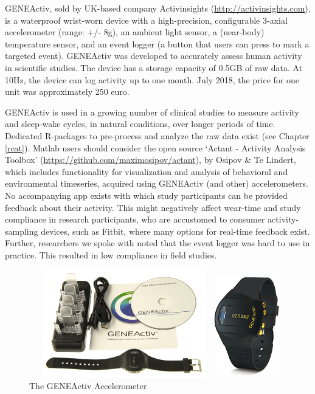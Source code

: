 \documentclass[]{book}
\begin{document}
 

GENEActiv, sold by UK-based company Activinsights
(\url{http://activinsights.com}), is a waterproof wrist-worn device with
a high-precision, configurable 3-axial accelerometer (range: +/- 8g), an
ambient light sensor, a (near-body) temperature sensor, and an event
logger (a button that users can press to mark a targeted event).
GENEActiv was developed to accurately assess human activity in
scientific studies. The device has a storage capacity of 0.5GB of raw
data. At 10Hz, the device can log activity up to one month. July 2018,
the price for one unit was approximately 250 euro.

GENEActiv is used in a growing number of clinical studies to measure
activity and sleep-wake cycles, in natural conditions, over longer
periods of time. Dedicated R-packages to pre-process and analyze the raw
data exist (see Chapter \ref{rcat}). Matlab users should consider the
open source `Actant - Activity Analysis Toolbox'
(\url{https://github.com/maximosipov/actant}), by Osipov \& Te Lindert,
which includes functionality for visualization and analysis of
behavioral and environmental timeseries, acquired using GENEActiv (and
other) accelerometers. No accompanying app exists with which study
participants can be provided feedback about their activity. This might
negatively affect wear-time and study compliance in research
participants, who are accustomed to consumer activity-sampling devices,
such as Fitbit, where many options for real-time feedback exist.
Further, researchers we spoke with noted that the event logger was hard
to use in practice. This resulted in low compliance in field studies.

\begin{figure}[!h]

{\centering \includegraphics[width=1\linewidth]{images/instruments/geneactive/geneactive-pack} 

}

\caption{The GENEActiv Accelerometer}\label{fig:geneactiv}
\end{figure}
\end{document}
